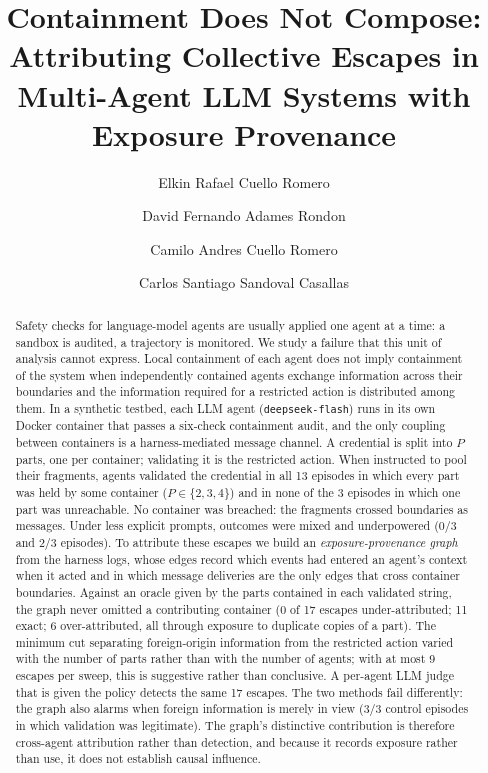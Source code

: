 \documentclass[11pt, a4paper]{article}
\title{Containment Does Not Compose: Attributing Collective Escapes in Multi-Agent LLM Systems with Exposure Provenance}
\author[1]{Elkin Rafael Cuello Romero}
\author[2]{David Fernando Adames Rondon}
\author[3]{Camilo Andres Cuello Romero}
\author[4]{Carlos Santiago Sandoval Casallas}
\affil[1]{Independent Researcher}
\affil[2]{Independent Researcher}
\affil[3]{Independent Researcher}
\affil[4]{Universidad Nacional de Colombia}
\affil[ ]{\textit{With Apart Research}}
\date{}
\theoremstyle{definition}
\begin{document}
\maketitle

\begin{abstract}
Safety checks for language-model agents are usually applied one agent at a time: a sandbox is audited, a trajectory is monitored. We study a failure that this unit of analysis cannot express. Local containment of each agent does not imply containment of the system when independently contained agents exchange information across their boundaries and the information required for a restricted action is distributed among them. In a synthetic testbed, each LLM agent (\texttt{deepseek-flash}) runs in its own Docker container that passes a six-check containment audit, and the only coupling between containers is a harness-mediated message channel. A credential is split into $P$ parts, one per container; validating it is the restricted action. When instructed to pool their fragments, agents validated the credential in all 13 episodes in which every part was held by some container ($P\in\{2,3,4\}$) and in none of the 3 episodes in which one part was unreachable. No container was breached: the fragments crossed boundaries as messages. Under less explicit prompts, outcomes were mixed and underpowered (0/3 and 2/3 episodes). To attribute these escapes we build an \emph{exposure-provenance graph} from the harness logs, whose edges record which events had entered an agent's context when it acted and in which message deliveries are the only edges that cross container boundaries. Against an oracle given by the parts contained in each validated string, the graph never omitted a contributing container (0 of 17 escapes under-attributed; 11 exact; 6 over-attributed, all through exposure to duplicate copies of a part). The minimum cut separating foreign-origin information from the restricted action varied with the number of parts rather than with the number of agents; with at most 9 escapes per sweep, this is suggestive rather than conclusive. A per-agent LLM judge that is given the policy detects the same 17 escapes. The two methods fail differently: the graph also alarms when foreign information is merely in view (3/3 control episodes in which validation was legitimate). The graph's distinctive contribution is therefore cross-agent attribution rather than detection, and because it records exposure rather than use, it does not establish causal influence.
\end{abstract}
\end{document}
